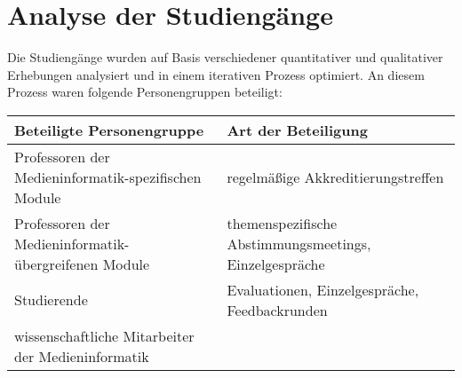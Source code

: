 \chapter{Analyse der
Studiengänge\label{/mi-2017/selbstbericht/0050-analyse-der-studiengaenge/0000-analyse-der-studiengaenge}}\label{analyse-der-studienguxe4ngepathlabelmi-2017selbstbericht0050-analyse-der-studiengaenge0000-analyse-der-studiengaenge}

Die Studiengänge wurden auf Basis verschiedener quantitativer und
qualitativer Erhebungen analysiert und in einem iterativen Prozess
optimiert. An diesem Prozess waren folgende Personengruppen beteiligt:

\begin{longtable}[c]{@{}ll@{}}
\toprule
\begin{minipage}[b]{0.5\columnwidth}\raggedright\strut
Beteiligte Personengruppe
\strut\end{minipage} &
\begin{minipage}[b]{0.5\columnwidth}\raggedright\strut
Art der Beteiligung
\strut\end{minipage}\tabularnewline
\midrule
\endhead
\begin{minipage}[t]{0.5\columnwidth}\raggedright\strut
Professoren der Medieninformatik-spezifischen Module
\strut\end{minipage} &
\begin{minipage}[t]{0.5\columnwidth}\raggedright\strut
regelmäßige Akkreditierungstreffen
\strut\end{minipage}\tabularnewline
\begin{minipage}[t]{0.5\columnwidth}\raggedright\strut
Professoren der Medieninformatik-übergreifenen Module
\strut\end{minipage} &
\begin{minipage}[t]{0.5\columnwidth}\raggedright\strut
themenspezifische Abstimmungsmeetings, Einzelgespräche
\strut\end{minipage}\tabularnewline
\begin{minipage}[t]{0.5\columnwidth}\raggedright\strut
Studierende
\strut\end{minipage} &
\begin{minipage}[t]{0.5\columnwidth}\raggedright\strut
Evaluationen, Einzelgespräche, Feedbackrunden
\strut\end{minipage}\tabularnewline
\begin{minipage}[t]{0.5\columnwidth}\raggedright\strut
wissenschaftliche Mitarbeiter der Medieninformatik
\strut\end{minipage} &

\end{longtable}
